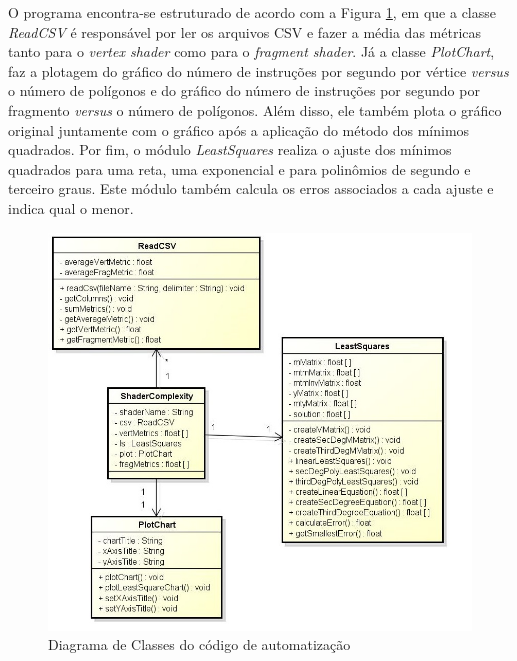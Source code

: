 	O programa encontra-se estruturado de acordo com a Figura \ref{minquad_diag}, em que a classe \textit{ReadCSV} é responsável por ler os arquivos CSV e fazer a média das métricas tanto para o \textit{vertex shader} como para o \textit{fragment shader}. Já a classe \textit{PlotChart}, faz a plotagem do gráfico do número de instruções por segundo por vértice \textit{versus} o número de polígonos e do gráfico do número de instruções por segundo por fragmento \textit{versus} o número de polígonos. Além disso, ele também plota o gráfico original juntamente com o gráfico após a aplicação do método dos mínimos quadrados. Por fim, o módulo \textit{LeastSquares} realiza o ajuste dos mínimos quadrados para uma reta, uma exponencial e para polinômios de segundo e terceiro graus. Este módulo também calcula os erros associados a cada ajuste e indica qual o menor. 

	\begin{figure}[h]
	\centering
		\includegraphics[keepaspectratio=true,scale=0.6]{figuras/minquad_diag.jpg}
	\caption{Diagrama de Classes do código de automatização}
	\label{minquad_diag}
	\end{figure}

